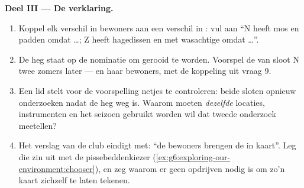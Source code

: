 \begin{problem}
\medskip\noindent\textbf{Deel III --- De verklaring.}
\begin{enumerate}[resume]
  \item Koppel elk verschil in bewoners aan een verschil in
        : vul aan ``N heeft mos en padden omdat \dots; Z
        heeft hagedissen en  met wasachtige  omdat
        \dots''.
  \item De heg staat op de nominatie om gerooid te worden. Voorspel de
         van sloot N twee zomers later --- en haar
        bewoners, met de koppeling uit vraag 9.
  \item Een lid stelt voor de voorspelling netjes te controleren: beide
        sloten opnieuw onderzoeken nadat de heg weg is. Waarom moeten
        \emph{dezelfde} locaties, instrumenten en het seizoen gebruikt
        worden wil dat tweede onderzoek meetellen?
  \item Het verslag van de club eindigt met: ``de bewoners brengen de
         in kaart''. Leg die zin uit met de
        pissebeddenkiezer
        (\cref{ex:g6:exploring-our-environment:chooser}), en zeg waarom
        er geen opdrijven nodig is om zo'n kaart zichzelf te laten
        tekenen.
\end{enumerate}
\end{problem}

